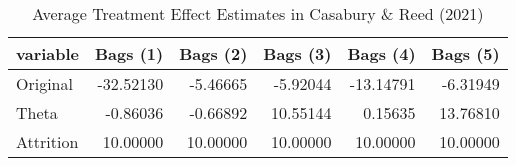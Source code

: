 \begin{table}[ht]
\centering
\begin{tabular}{lrrrrr}
  \hline
variable & Bags (1) & Bags (2) & Bags (3) & Bags (4) & Bags (5) \\ 
  \hline
Original & -32.52130 & -5.46665 & -5.92044 & -13.14791 & -6.31949 \\ 
  Theta & -0.86036 & -0.66892 & 10.55144 & 0.15635 & 13.76810 \\ 
  Attrition & 10.00000 & 10.00000 & 10.00000 & 10.00000 & 10.00000 \\ 
  \end{tabular}
\caption{Average Treatment Effect Estimates in Casabury \& Reed (2021)} 
\end{table}
